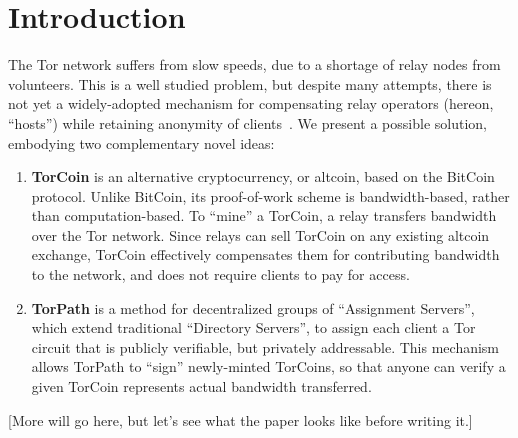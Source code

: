 \section{Introduction}

The Tor network suffers from slow speeds, due to a shortage of relay nodes
from volunteers. This is a well studied problem, but despite many attempts,
there is not yet a widely-adopted mechanism for compensating relay operators
(hereon, ``hosts'') while retaining anonymity of clients~\cite{raykova-
pet2008, wpes09-xpay, incentives-fc10, ccs10-braids, acsac11-tortoise,
jansen2013lira, johnson2013onions}. We present a possible solution, embodying
two complementary novel ideas:

\begin{enumerate}
\item \textbf{TorCoin} is an alternative cryptocurrency, or altcoin, based on the BitCoin protocol\cite{nakamoto2008bitcoin}. Unlike BitCoin, its proof-of-work scheme is bandwidth-based, rather than computation-based. To ``mine'' a TorCoin, a relay transfers bandwidth over the Tor network. Since relays can sell TorCoin on any existing altcoin exchange, TorCoin effectively compensates them for contributing bandwidth to the network, and does not require clients to pay for access.

\item \textbf{TorPath} is a method for decentralized groups of ``Assignment Servers'', which extend traditional ``Directory Servers'', to assign each client a Tor circuit that is publicly verifiable, but privately addressable. This mechanism allows TorPath to ``sign'' newly-minted TorCoins, so that anyone can verify a given TorCoin represents actual bandwidth transferred. 
\end{enumerate}

[More will go here, but let's see what the paper looks like before writing it.]
